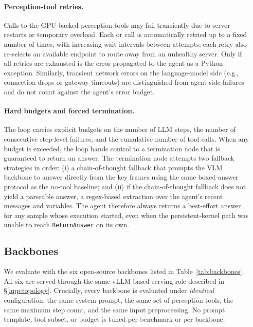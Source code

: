 \paragraph{Perception-tool retries.}
Calls to the GPU-backed perception tools may fail transiently due to server restarts or temporary overload. Each  or  call is automatically retried up to a fixed number of times, with increasing wait intervals between attempts; each retry also re-selects an available endpoint to route away from an unhealthy server. Only if all retries are exhausted is the error propagated to the agent as a Python exception. Similarly, transient network errors on the language-model side (e.g., connection drops or gateway timeouts) are distinguished from agent-side failures and do not count against the agent's error budget.

\paragraph{Hard budgets and forced termination.}
The loop carries explicit budgets on the number of LLM steps, the number of consecutive step-level failures, and the cumulative number of tool calls. When any budget is exceeded, the loop hands control to a termination node that is guaranteed to return an answer. The termination node attempts two fallback strategies in order: (i) a chain-of-thought fallback that prompts the VLM backbone to answer directly from the key frames using the same boxed-answer protocol as the no-tool baseline; and (ii) if the chain-of-thought fallback does not yield a parseable answer, a regex-based extraction over the agent's recent messages and variables. The agent therefore always returns a best-effort answer for any sample whose execution started, even when the persistent-kernel path was unable to reach \texttt{ReturnAnswer} on its own.

\subsection{Backbones}
\label{app:backbones}

We evaluate \ours{} with the six open-source backbones listed in Table~\ref{tab:backbones}. All six are served through the same vLLM-based serving role described in \S\ref{app:topology}. Crucially, every backbone is evaluated under \emph{identical} configuration: the same system prompt, the same set of perception tools, the same maximum step count, and the same input preprocessing. No prompt template, tool subset, or budget is tuned per benchmark or per backbone.

